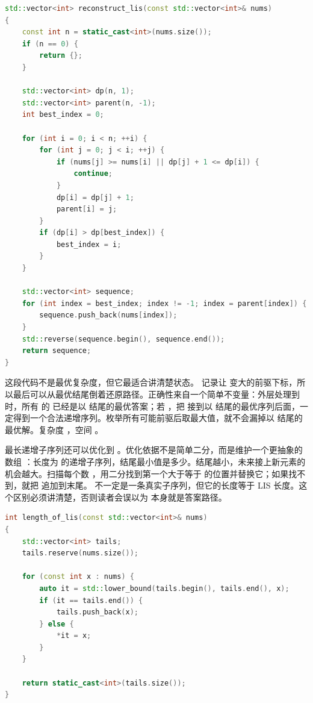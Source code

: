 \begin{lstlisting}[language=C++,caption={LeetCode 300 最长递增子序列：二次 DP 和路径还原}]
std::vector<int> reconstruct_lis(const std::vector<int>& nums)
{
    const int n = static_cast<int>(nums.size());
    if (n == 0) {
        return {};
    }

    std::vector<int> dp(n, 1);
    std::vector<int> parent(n, -1);
    int best_index = 0;

    for (int i = 0; i < n; ++i) {
        for (int j = 0; j < i; ++j) {
            if (nums[j] >= nums[i] || dp[j] + 1 <= dp[i]) {
                continue;
            }
            dp[i] = dp[j] + 1;
            parent[i] = j;
        }
        if (dp[i] > dp[best_index]) {
            best_index = i;
        }
    }

    std::vector<int> sequence;
    for (int index = best_index; index != -1; index = parent[index]) {
        sequence.push_back(nums[index]);
    }
    std::reverse(sequence.begin(), sequence.end());
    return sequence;
}
\end{lstlisting}

这段代码不是最优复杂度，但它最适合讲清楚状态。  记录让  变大的前驱下标，所以最后可以从最优结尾倒着还原路径。正确性来自一个简单不变量：外层处理到  时，所有  的  已经是以  结尾的最优答案；若 ，把  接到以  结尾的最优序列后面，一定得到一个合法递增序列。枚举所有可能前驱后取最大值，就不会漏掉以  结尾的最优解。复杂度 ，空间 。

最长递增子序列还可以优化到 。优化依据不是简单二分，而是维护一个更抽象的数组 ：长度为  的递增子序列，结尾最小值是多少。结尾越小，未来接上新元素的机会越大。扫描每个数 ，用二分找到第一个大于等于  的位置并替换它；如果找不到，就把  追加到末尾。  不一定是一条真实子序列，但它的长度等于 LIS 长度。这个区别必须讲清楚，否则读者会误以为  本身就是答案路径。

\begin{lstlisting}[language=C++,caption={LeetCode 300 最长递增子序列：tails 数组和二分优化}]
int length_of_lis(const std::vector<int>& nums)
{
    std::vector<int> tails;
    tails.reserve(nums.size());

    for (const int x : nums) {
        auto it = std::lower_bound(tails.begin(), tails.end(), x);
        if (it == tails.end()) {
            tails.push_back(x);
        } else {
            *it = x;
        }
    }

    return static_cast<int>(tails.size());
}
\end{lstlisting}

